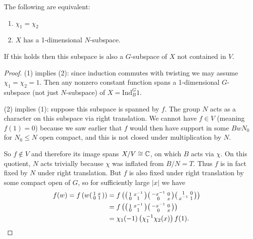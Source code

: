 \begin{prop}
    The following are equivalent:
    \begin{enumerate}
        \item $\chi_1=\chi_2$
        \item $X$ has a 1-dimensional $N$-subspace.
    \end{enumerate}
    If this holds then this subspace is also a $G$-subspace of $X$ not contained in $V$.
\end{prop}
\begin{proof}
    (1) implies (2): since induction commutes with twisting we may assume $\chi_1=\chi_2=1$. Then any nonzero constant function spans a 1-dimensional $G$-subspace (not just $N$-subspace) of $X = \mathrm{Ind}_B^G 1$.

    (2) implies (1): suppose this subspace is spanned by $f$. The group $N$ acts as a character on this subspace via right translation. We cannot have $f \in V$ (meaning $f(1)=0$) because we saw earlier that $f$ would then have support in some $BwN_0$ for $N_0 \leq N$ open compact, and this is not closed under multiplication by $N$.

    So $f \not\in V$ and therefore its image spans $X/V \cong \mathbb{C}$, on which $B$ acts via $\chi$. On this quotient, $N$ acts trivially because $\chi$ was inflated from $B/N=T$. Thus $f$ is in fact fixed by $N$ under right translation. But $f$ is also fixed under right translation by some compact open of $G$, so for sufficiently large $|x|$ we have
    \begin{equation*}
        \begin{split}
            f(w) = f\left(w \begin{psmallmatrix}
                1&x \\0 & 1
            \end{psmallmatrix}\right) &= f\left( \begin{psmallmatrix}
                1&x^{-1} \\0 & 1
            \end{psmallmatrix}\begin{psmallmatrix}
                -x^{-1}&0 \\0 & x
            \end{psmallmatrix}\begin{psmallmatrix}
                1&0 \\x^{-1} & 1
            \end{psmallmatrix}\right) \\
            &= f\left( \begin{psmallmatrix}
                1&x^{-1} \\0 & 1
            \end{psmallmatrix}\begin{psmallmatrix}
                -x^{-1}&0 \\0 & x
            \end{psmallmatrix}\right) \\
            &= \chi_1(-1) \left( \chi_1^{-1}\chi_2(x)\right) f(1).
        \end{split}
    \end{equation*}


\end{proof}
